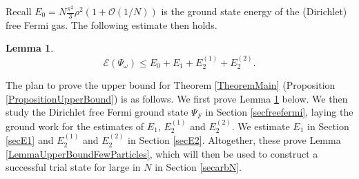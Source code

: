 \documentclass[a4paper,11pt]{article}
\newtheorem{lemma}[theorem]{Lemma}
\numberwithin{equation}{section}
\begin{document}
Recall $E_0=N\frac{\pi^2}{3}\rho^2(1+\mathcal{O}(1/N)) $ is the ground state energy of the (Dirichlet) free Fermi gas. The following estimate then holds.
\begin{lemma}\label{LemmaEnergyFunctionalBound}
\begin{equation}\label{EqBound1}
\mathcal{E}(\Psi_\omega)\leq E_0+ E_1+E_2^{(1)}+E_2^{(2)}.
\end{equation}
\end{lemma}
The plan to prove the upper bound for Theorem \ref{TheoremMain} (Proposition \ref{PropositionUpperBound}) is as follows. We first prove Lemma \ref{LemmaEnergyFunctionalBound} below. We then study the Dirichlet free Fermi ground state $\Psi_F$ in Section \ref{secfreefermi}, laying the ground work for the estimates of $E_1$, $E_2^{(1)}$ and $E_2^{(2)}$. We estimate $E_1$ in Section \ref{secE1} and $E^{(1)}_2$ and $E^{(2)}_2$ in Section \ref{secE2}. Altogether, these prove Lemma \ref{LemmaUpperBoundFewParticles}, which will then be used to construct a successful trial state for large in $N$ in Section \ref{secarbN}.
\end{document}
